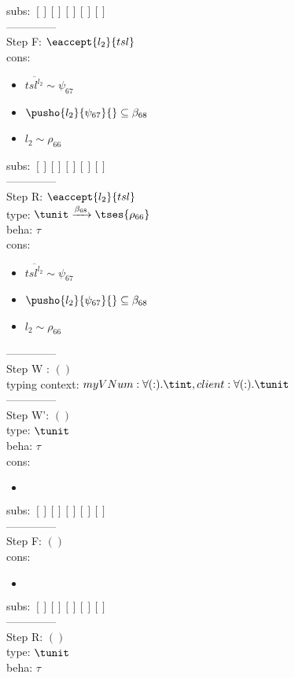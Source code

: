 \documentclass[12pt]{article}
\begin{document}
  subs:  $ [ ] [] [] [] [] $  
 \\--------------\\ 
Step F: $ \eaccept{ l_{2} }{tsl} $
 \\ cons: \begin{itemize}
\item $ \overline{{tsl}^{l_{2}}} \sim\psi_{67} $
\item $ \pusho{ l_{2}} {\psi_{67}}{} \subseteq \beta_{68} $
\item $ l_{2} \sim\rho_{66} $
\end{itemize}
 subs:  $ [ ] [] [] [] [] $ 
  \\--------------\\ 
Step R: $ \eaccept{ l_{2} }{tsl} $\\
  type: $ \tunit \xrightarrow{\beta_{68}}  \tses{ \rho_{66}} $ 
\\  beha: $ \tau $ 
\\  cons: \begin{itemize}
\item $ \overline{{tsl}^{l_{2}}} \sim\psi_{67} $
\item $ \pusho{ l_{2}} {\psi_{67}}{} \subseteq \beta_{68} $
\item $ l_{2} \sim\rho_{66} $
\end{itemize} 
  --------------\\ 
Step W : $ () $\\
 typing context: $ myVNum:\forall ( : ). \tint, client:\forall ( : ). \tunit$ 
\\ --------------\\
Step W': $ () $\\
  type: $ \tunit $ 
\\  beha: $ \tau $ 
\\  cons: \begin{itemize}
\item $  $
\end{itemize} 
  subs:  $ [ ] [] [] [] [] $  
 \\--------------\\ 
Step F: $ () $
 \\ cons: \begin{itemize}
\item $  $
\end{itemize}
 subs:  $ [ ] [] [] [] [] $ 
  \\--------------\\ 
Step R: $ () $\\
  type: $ \tunit $ 
\\  beha: $ \tau $ 
\end{document}
